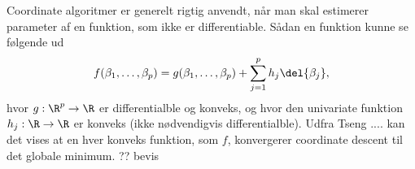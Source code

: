 Coordinate algoritmer er generelt rigtig anvendt, når man skal estimerer parameter af en funktion, som ikke er differentiable. Sådan en funktion kunne se følgende ud
\begin{align*}
f(\beta_1, \dots, \beta_p) = g(\beta_1, \dots, \beta_p) + \sum_{j = 1}^p h_j \del{\beta_j},
\end{align*}
hvor $g: \R^p \rightarrow \R $ er differentialble og konveks, og hvor den univariate funktion $h_j : \R \rightarrow \R$ er konveks (ikke nødvendigvis differentialble). Udfra Tseng .... kan det vises at en hver konveks funktion, som $f$, konvergerer coordinate descent til det globale minimum. 
?? bevis
 


